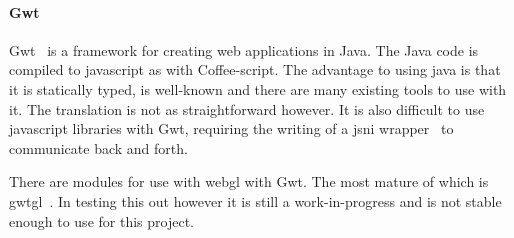 \documentclass[12pt]{article}
\begin{document}
\paragraph{Gwt}
Gwt~\cite{web:gwt} is a framework for creating web applications in Java.
The Java code is compiled to javascript as with Coffee-script.
The advantage to using java is that it is statically typed, is well-known and there are many existing tools to use with it.
The translation is not as straightforward however.
It is also difficult to use javascript libraries with Gwt, requiring the writing of a jsni wrapper~\cite{web:jsni} to communicate back and forth.

There are modules for use with webgl with Gwt.
The most mature of which is gwtgl~\cite{web:gwtgl}.
In testing this out however it is still a work-in-progress and is not stable enough to use for this project.



\end{document}
